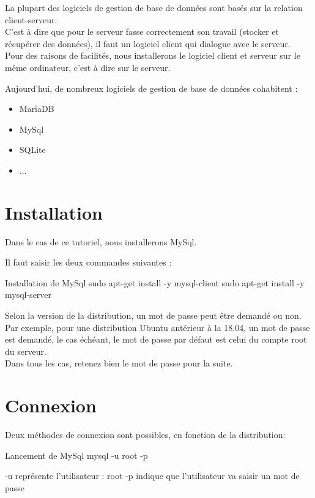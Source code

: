 {La plupart des logiciels de gestion de base de données sont basés sur la relation client-serveur.\\
C’est à dire que pour le serveur fasse correctement son travail (stocker et récupérer des données), il faut un logiciel client qui dialogue avec le serveur. \\
Pour des raisons de facilités, nous installerons le logiciel client et serveur sur le même ordinateur, c'est à dire sur le serveur.

Aujourd’hui, de nombreux logiciels de gestion de base de données cohabitent : 

\begin{itemize}
    \item MariaDB
    \item MySql
    \item SQLite
    \item ...
\end{itemize}

\section{Installation}
Dans le cas de ce tutoriel, nous installerons MySql.

Il faut saisir les deux commandes suivantes : 

\begin{Bash}{Installation de MySql}
sudo apt-get install -y mysql-client
sudo apt-get install -y mysql-server
\end{Bash}

Selon la version de la distribution, un mot de passe peut être demandé ou non.
Par exemple, pour une distribution Ubuntu antérieur à la 18.04, un mot de passe est demandé, le cas échéant, le mot de passe par défaut est celui du compte root du serveur. \\
Dans tous les cas, retenez bien le mot de passe pour la suite.

\section{Connexion}

Deux méthodes de connexion sont possibles, en fonction de la distribution: 

\begin{Bash}{Lancement de MySql}
mysql -u root -p
\end{Bash}

-u 	représente l’utilisateur : root
-p 	indique que l’utilisateur va saisir un mot de passe

}
